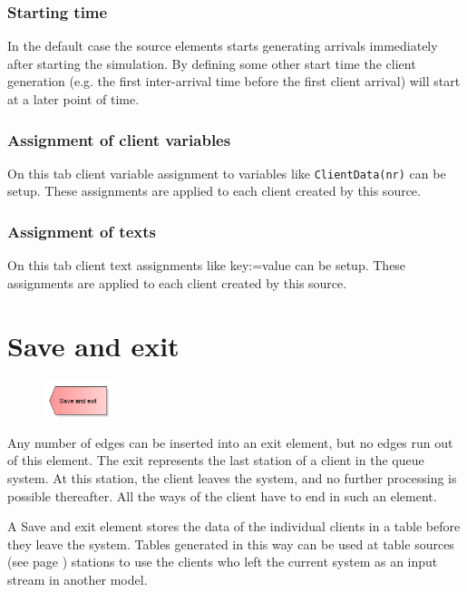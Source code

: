 \subsubsection*{Starting time}

In the default case the source elements starts generating arrivals immediately after
starting the simulation. By defining some other start time the client generation
(e.g. the first inter-arrival time before the first client arrival) will start at a later
point of time.

\subsubsection*{Assignment of client variables}

On this tab client variable assignment to variables like \texttt{ClientData(nr)} can be setup.
These assignments are applied to each client created by this source.

\subsubsection*{Assignment of texts}

On this tab client text assignments like key:=value can be setup.
These assignments are applied to each client created by this source.


\section{Save and exit}
\label{ref:ModelElementDisposeWithTable}

\begin{figure}
\vspace{-22pt}
\includegraphics[width=2cm]{imageModelElementDisposeWithTable.png}
\vspace{-22pt}
\end{figure}

Any number of edges can be inserted into an exit element, but no edges run out of this element.
The exit represents the last station of a client in the queue system.
At this station, the client leaves the system, and no further processing is possible thereafter.
All the ways of the client have to end in such an element.

A Save and exit element stores the data of the individual clients in a table before they leave the system.
Tables generated in this way can be used at table sources (see page \pageref{ref:ModelElementSourceTable}) stations
to use the clients who left the current system as an input stream in another model.

